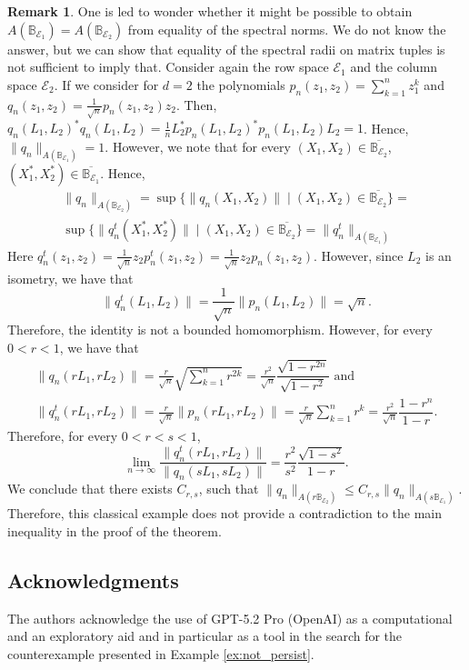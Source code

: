 \documentclass[12pt]{amsart}
\numberwithin{equation}{section}
\theoremstyle{definition}
\newtheorem{remark}[theorem]{Remark}
\newcommand{\cE}{\mathcal{E}}
\newcommand{\bB}{\mathbb{B}}
\begin{document}
\begin{remark}
        One is led to wonder whether it might be possible to obtain $A(\bB_{\cE_1}) = A(\bB_{\cE_2})$ from equality of the spectral norms. We do not know the answer, but we can show that equality of the spectral radii on matrix tuples is not sufficient to imply that. Consider again the row space $\cE_1$ and the column space $\cE_2$. If we consider for $d = 2$ the polynomials $p_n(z_1,z_2) = \sum_{k=1}^n z_1^k$ and $q_n(z_1,z_2) = \frac{1}{\sqrt{n}} p_n(z_1,z_2) z_2$. Then, $q_n(L_1,L_2)^* q_n(L_1,L_2) = \frac{1}{n} L_2^* p_n(L_1,L_2)^* p_n(L_1,L_2) L_2 = 1$. Hence, $\|q_n\|_{A(\bB_{\cE_1})} = 1$. However, we note that for every $(X_1,X_2) \in \overline{\bB_{\cE_2}}$, $(X_1^*,X_2^*) \in \overline{\bB_{\cE_1}}$. Hence,
    \begin{multline*}
    \|q_n\|_{A(\bB_{\cE_2})} = \sup\{\|q_n(X_1,X_2)\| \mid (X_1,X_2) \in \overline{\bB_{\cE_2}}\} = \\ \sup\{ \|q_n^t(X_1^*,X_2^*)\| \mid (X_1,X_2) \in \overline{\bB_{\cE_2}} \} = \|q_n^t\|_{A(\bB_{\cE_1})}
\end{multline*}
    Here $q_n^t(z_1,z_2) = \frac{1}{\sqrt{n}} z_2 p_n^t(z_1,z_2) = \frac{1}{\sqrt{n}} z_2 p_n(z_1,z_2)$. However, since $L_2$ is an isometry, we have that
    \[
    \|q_n^t(L_1,L_2)\| = \frac{1}{\sqrt{n}} \|p_n(L_1,L_2)\| = \sqrt{n}.
    \]
    Therefore, the identity is not a bounded homomorphism. However, for every $0 < r < 1$, we have that
    \begin{multline*}
    \|q_n(rL_1,rL_2)\| = \frac{r}{\sqrt{n}} \sqrt{\sum_{k=1}^n r^{2k}} = \frac{r^2}{\sqrt{n}} \dfrac{\sqrt{1 - r^{2n}}}{\sqrt{1-r^2}} \text{ and } \\ \|q_n^t(rL_1,rL_2)\| = \frac{r}{\sqrt{n}} \|p_n(r L_1, r L_2)\| = \frac{r}{\sqrt{n}} \sum_{k=1}^n r^k = \frac{r^2}{\sqrt{n}} \dfrac{1 - r^{n}}{1 - r}. 
    \end{multline*}
    Therefore, for every $0 < r < s < 1$,
    \[
    \lim_{n \to \infty} \frac{\|q_n^t(rL_1,rL_2)\|}{\|q_n(sL_1,sL_2)\|} = \frac{r^2}{s^{2}} \frac{\sqrt{1 - s^2}}{1 - r}.
    \]
    We conclude that there exists $C_{r,s}$, such that $\|q_n\|_{A(r \bB_{\cE_2})} \leq C_{r,s} \|q_n\|_{A(s \bB_{\cE_1})}$. Therefore, this classical example does not provide a contradiction to the main inequality in the proof of the theorem.
\end{remark}






\subsection*{Acknowledgments} The authors acknowledge the use of GPT-5.2 Pro (OpenAI) as a computational and an exploratory aid and in particular as a tool in the search for the counterexample presented in Example \ref{ex:not_persist}. 






%

\end{document}
